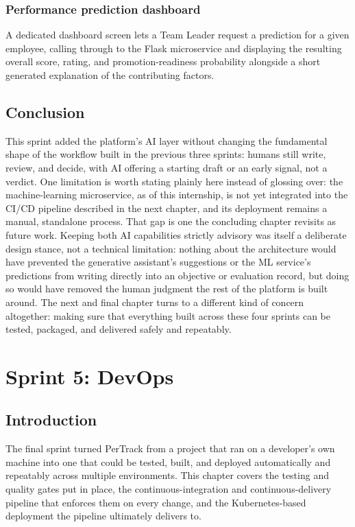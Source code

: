 \documentclass[12pt,a4paper]{report}
\begin{document}
\subsection{Performance prediction dashboard}

A dedicated dashboard screen lets a Team Leader request a prediction for a given employee, calling through to the Flask microservice and displaying the resulting overall score, rating, and promotion-readiness probability alongside a short generated explanation of the contributing factors.

\section{Conclusion}

This sprint added the platform's AI layer without changing the fundamental shape of the workflow built in the previous three sprints: humans still write, review, and decide, with AI offering a starting draft or an early signal, not a verdict. One limitation is worth stating plainly here instead of glossing over: the machine-learning microservice, as of this internship, is not yet integrated into the CI/CD pipeline described in the next chapter, and its deployment remains a manual, standalone process. That gap is one the concluding chapter revisits as future work. Keeping both AI capabilities strictly advisory was itself a deliberate design stance, not a technical limitation: nothing about the architecture would have prevented the generative assistant's suggestions or the ML service's predictions from writing directly into an objective or evaluation record, but doing so would have removed the human judgment the rest of the platform is built around. The next and final chapter turns to a different kind of concern altogether: making sure that everything built across these four sprints can be tested, packaged, and delivered safely and repeatably.

\chapter{Sprint 5: DevOps}
\label{ch:sprint5}

\section{Introduction}

The final sprint turned PerTrack from a project that ran on a developer's own machine into one that could be tested, built, and deployed automatically and repeatably across multiple environments. This chapter covers the testing and quality gates put in place, the continuous-integration and continuous-delivery pipeline that enforces them on every change, and the Kubernetes-based deployment the pipeline ultimately delivers to.
\end{document}
